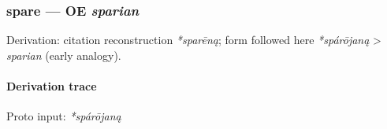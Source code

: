 \documentclass[
  british,
  a4paper,
]{article}
\begin{document}
\subsubsection{\texorpdfstring{spare --- OE
\emph{sparian}}{spare --- OE sparian}}\label{spare-oe-sparian}

Derivation: citation reconstruction \emph{*sparēną}; form followed here
\emph{*spárōjaną} \textgreater{} \emph{sparian} (early analogy).

\paragraph{Derivation trace}\label{derivation-trace-134}

Proto input: \emph{*spárōjaną}

\begingroup
\setlength{\fboxsep}{6pt}
\end{document}
